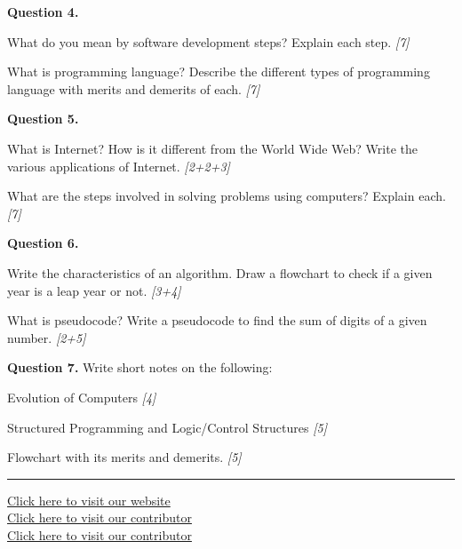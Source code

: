 \documentclass[11pt,a4paper]{article}
\newcommand{\pts}[1]{\hfill   \textit{[#1]}}
\begin{document}
\medskip


\noindent   \textbf{Question 4.}

\begin{parts}
  \item What do you mean by software development steps? Explain each step. \pts{7}
  \item What is programming language? Describe the different types of programming language with merits and demerits of each. \pts{7}
\end{parts}

\medskip


\noindent   \textbf{Question 5.}

\begin{parts}
  \item What is Internet? How is it different from the World Wide Web? Write the various applications of Internet. \pts{2+2+3}
  \item What are the steps involved in solving problems using computers? Explain each. \pts{7}
\end{parts}

\medskip


\noindent   \textbf{Question 6.}

\begin{parts}
  \item Write the characteristics of an algorithm. Draw a flowchart to check if a given year is a leap year or not. \pts{3+4}
  \item What is pseudocode? Write a pseudocode to find the sum of digits of a given number. \pts{2+5}
\end{parts}

\medskip


\noindent   \textbf{Question 7.} Write short notes on the following:

\begin{parts}
  \item Evolution of Computers \pts{4}
  \item Structured Programming and Logic/Control Structures \pts{5}
  \item Flowchart with its merits and demerits. \pts{5}
\end{parts}

\vfill
\rule{\linewidth}{0.4pt}

\begin{center}\small
\href{https://bhu-exam.vercel.app/}{Click here to visit our website}\\[4pt]\href{https://me-aryan.vercel.app/}{Click here to visit our contributor}\\[4pt]\href{https://quashan-me.vercel.app/}{Click here to visit our contributor}
\end{center}
\end{document}
